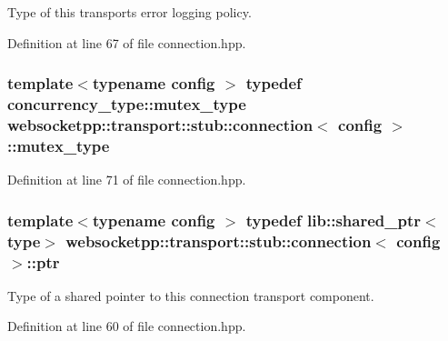 Type of this transport\textquotesingle{}s error logging policy. 



Definition at line 67 of file connection.\+hpp.

\hypertarget{classwebsocketpp_1_1transport_1_1stub_1_1connection_a62261bc76c6c06fc7d126a3c1343c39e}{}
\subsubsection[{mutex\+\_\+type}]{\setlength{\rightskip}{0pt plus 5cm}template$<$typename config $>$ typedef concurrency\+\_\+type\+::mutex\+\_\+type {\bf websocketpp\+::transport\+::stub\+::connection}$<$ config $>$\+::{\bf mutex\+\_\+type}}\label{classwebsocketpp_1_1transport_1_1stub_1_1connection_a62261bc76c6c06fc7d126a3c1343c39e}


Definition at line 71 of file connection.\+hpp.

\hypertarget{classwebsocketpp_1_1transport_1_1stub_1_1connection_aeb856d2a6734d303e13bed57c3d1081b}{}
\subsubsection[{ptr}]{\setlength{\rightskip}{0pt plus 5cm}template$<$typename config $>$ typedef lib\+::shared\+\_\+ptr$<${\bf type}$>$ {\bf websocketpp\+::transport\+::stub\+::connection}$<$ config $>$\+::{\bf ptr}}\label{classwebsocketpp_1_1transport_1_1stub_1_1connection_aeb856d2a6734d303e13bed57c3d1081b}


Type of a shared pointer to this connection transport component. 



Definition at line 60 of file connection.\+hpp.

\hypertarget{classwebsocketpp_1_1transport_1_1stub_1_1connection_aa47474957b35f4d2deab44c644378615}{}
